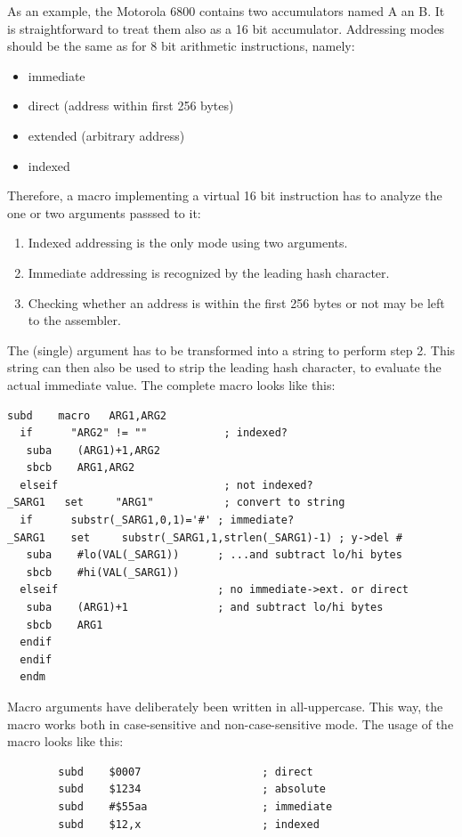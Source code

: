 \documentclass[12pt,twoside]{report}
\begin{document}
As an example, the Motorola 6800 contains two accumulators named A an B.  It
is straightforward to treat them also as a 16 bit accumulator.  Addressing modes
should be the same as for 8 bit arithmetic instructions, namely:
\begin{itemize}
\item{immediate}
\item{direct (address within first 256 bytes)}
\item{extended (arbitrary address)}
\item{indexed}
\end{itemize}
Therefore, a macro implementing a virtual 16 bit instruction has to analyze
the one or two arguments passsed to it:
\begin{enumerate}
\item{Indexed addressing is the only mode using two arguments.}
\item{Immediate addressing is recognized by the leading hash character.}
\item{Checking whether an address is within the first 256 bytes or not
      may be left to the assembler.}
\end{enumerate}
The (single) argument has to be transformed into a string to perform step 2.
This string can then also be used to strip the leading hash character, to evaluate
the actual immediate value.  The complete macro looks like this:
\begin{verbatim}
subd    macro   ARG1,ARG2
  if      "ARG2" != ""            ; indexed?
   suba    (ARG1)+1,ARG2
   sbcb    ARG1,ARG2
  elseif                          ; not indexed?
_SARG1   set     "ARG1"           ; convert to string
  if      substr(_SARG1,0,1)='#' ; immediate?
_SARG1    set     substr(_SARG1,1,strlen(_SARG1)-1) ; y->del #
   suba    #lo(VAL(_SARG1))      ; ...and subtract lo/hi bytes
   sbcb    #hi(VAL(_SARG1))
  elseif                         ; no immediate->ext. or direct
   suba    (ARG1)+1              ; and subtract lo/hi bytes
   sbcb    ARG1
  endif
  endif
  endm
\end{verbatim}
Macro arguments have deliberately been written in all-uppercase.  This way,
the macro works both in case-sensitive and non-case-sensitive mode.  The
usage of the macro looks like this:
\begin{verbatim}
        subd    $0007                   ; direct
        subd    $1234                   ; absolute
        subd    #$55aa                  ; immediate
        subd    $12,x                   ; indexed
\end{verbatim}
\end{document}
